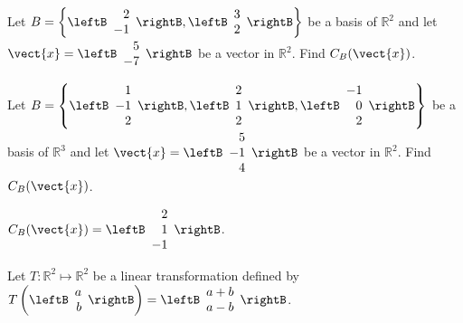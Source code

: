 \begin{enumialphparenastyle}
\begin{ex}
Let $B = \left\{ \leftB \begin{array}{r}
2 \\
-1 
\end{array} \rightB, \leftB \begin{array}{r}
3 \\
2
\end{array} \rightB \right\}$ be a basis of $\mathbb{R}^2$ and let $\vect{x} = \leftB
\begin{array}{r}
5 \\
-7
\end{array}
\rightB$ be a vector in $\mathbb{R}^2$. Find $C_B(\vect{x})$. 
\end{ex}

\begin{ex}
Let $B = \left\{ \leftB \begin{array}{r}
1 \\
-1 \\
2 
\end{array} \rightB, \leftB \begin{array}{r}
2 \\
1 \\
2
 \end{array} \rightB, \leftB \begin{array}{r}
-1 \\
0 \\
2
\end{array} \rightB \right\}$ 
be a basis of $\mathbb{R}^3$ and let $\vect{x} = \leftB
\begin{array}{r}
5 \\
-1 \\
4
\end{array}
\rightB$ be a vector in $\mathbb{R}^2$. Find $C_B(\vect{x})$. 
\begin{sol}
 $C_B(\vect{x}) = 
\leftB \begin{array}{r}
2 \\
1 \\
-1
 \end{array} \rightB $.
\end{sol}
\end{ex}


\begin{ex}
Let $T: \mathbb{R}^2 \mapsto \mathbb{R}^2$ be a linear transformation defined by $T \left( \leftB \begin{array}{r}
a \\
b
\end{array} \rightB \right) = \leftB \begin{array}{r}
a+b \\
a-b
\end{array} \rightB$. 


\end{ex}
\end{enumialphparenastyle}
